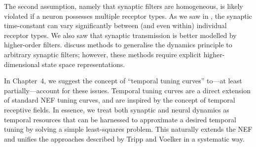 The second assumption, namely that synaptic filters are homogeneous, is likely violated if a neuron possesses multiple receptor types.
As we saw in , the synaptic time-constant can vary significantly between (and even within) individual receptor types.
We also saw that synaptic transmission is better modelled by higher-order filters.
 discuss methods to generalise the dynamics principle to arbitrary synaptic filters; however, these methods require explicit higher-dimensional state space representations.

In Chapter~4, we suggest the concept of \enquote{temporal tuning curves} to---at least partially---account for these issues.
Temporal tuning curves are a direct extension of standard NEF tuning curves, and are inspired by the concept of temporal receptive fields.
In essence, we treat both synaptic and neural dynamics as temporal resources that can be harnessed to approximate a desired temporal tuning by solving a simple least-squares problem.
This naturally extends the NEF and unifies the approaches described by Tripp and Voelker in a systematic way.
